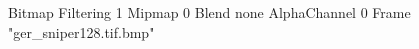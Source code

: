 {Bitmap
	{Filtering 1}
	{Mipmap 0}
	{Blend none}
	{AlphaChannel 0}
	{Frame "ger_sniper128.tif.bmp"}
}
